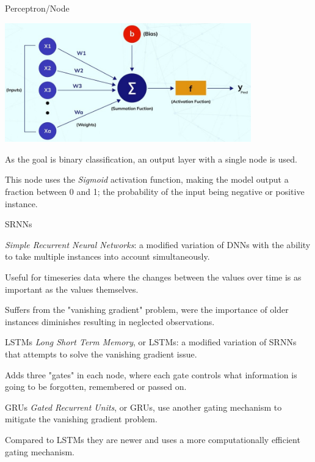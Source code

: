 \documentclass[10pt]{beamer}
\begin{document}
\begin{frame}{Perceptron/Node}
\begin{center} \includegraphics[width=0.8\textwidth]{figures/perceptron} \end{center}
As the goal is binary classification, an output layer with a single node is used.
\par
This node uses the \textit{Sigmoid} activation function, making the model output a fraction between 0 and 1; the probability of the input being negative or positive instance.
\end{frame}


\begin{frame}{SRNNs}
\par
\textit{Simple Recurrent Neural Networks}: a modified variation of DNNs with the ability to take multiple instances into account simultaneously.
\par
Useful for timeseries data where the changes between the values over time is as important as the values themselves.
\par
Suffers from the "vanishing gradient" problem, were the importance of older instances diminishes resulting in neglected observations.
\end{frame}


\begin{frame}{LSTMs}
\textit{Long Short Term Memory}, or LSTMs: a modified variation of SRNNs that attempts to solve the vanishing gradient issue.
\par
Adds three "gates" in each node, where each gate controls what information is going to be forgotten, remembered or passed on.
\end{frame}


\begin{frame}{GRUs}
\textit{Gated Recurrent Units}, or GRUs, use another gating mechanism to mitigate the vanishing gradient problem.
\par
Compared to LSTMs they are newer and uses a more computationally efficient gating mechanism.
\end{frame}
\end{document}
